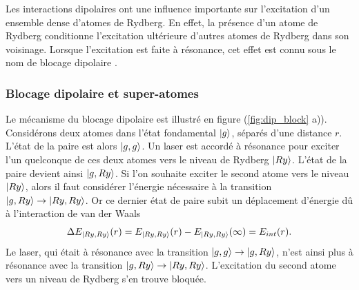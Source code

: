\noindent Les interactions dipolaires ont une influence importante sur l'excitation d'un ensemble dense d'atomes de Rydberg.	
En effet, la présence d'un atome de Rydberg conditionne l'excitation ultérieure d'autres atomes de Rydberg dans son voisinage.
Lorsque l'excitation est faite à résonance, cet effet est connu sous le nom de \og blocage dipolaire \fg{}.

	\subsubsection*{Blocage dipolaire et super-atomes}
\noindent Le mécanisme du blocage dipolaire est illustré en figure (\ref{fig:dip_block} a)).
Considérons deux atomes dans l'état fondamental $\ket{g}$, séparés d'une distance $r$.
L'état de la paire est alors $\ket{g,g}$.
Un laser est accordé à résonance pour exciter l'un quelconque de ces deux atomes vers le niveau de Rydberg $\ket{Ry}$.
L'état de la paire devient ainsi $\ket{g,Ry}$. %
Si l'on souhaite exciter le second atome vers le niveau $\ket{Ry}$, alors il faut considérer l'énergie nécessaire à la transition $\ket{g,Ry} \rightarrow \ket{Ry,Ry}$.
Or ce dernier état de paire subit un déplacement d'énergie dû à l'interaction de van der Waals
%
\begin{equation}
\label{eq:DeltaE_block}
\Delta E_{\ket{Ry,Ry}}(r) = E_{\ket{Ry,Ry}}(r)-E_{\ket{Ry,Ry}}(\infty)
= E_{int}(r).
\end{equation}
%
Le laser, qui était à résonance avec la transition $\ket{g,g}\rightarrow\ket{g,Ry}$, n'est ainsi plus à résonance avec la transition $\ket{g,Ry}\rightarrow\ket{Ry,Ry}$.
L'excitation du second atome vers un niveau de Rydberg s'en trouve bloquée.


